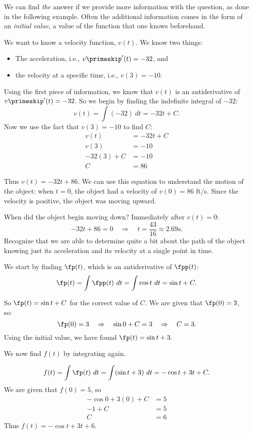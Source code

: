 We can find \textit{the} answer if we provide more information with the question, as done in the following example. Often the additional information comes in the form of an \textit{initial value}, a value of the function that one knows beforehand.

{We want to know a velocity function, $v(t)$. We know two things:
	\begin{itemize}
		\item		The acceleration, i.e., $v\primeskip'(t)= -32$, and
		\item		the velocity at a specific time, i.e., $v(3) = -10$.
	\end{itemize}
Using the first piece of information, we know that $v(t)$ is an antiderivative of $v\primeskip'(t)=-32$. So we begin by finding the indefinite integral of $-32$:
$$v(t)=\int (-32)\ dt = -32t+C.$$
Now we use the fact that $v(3)=-10$ to find $C$:
\begin{align*}
	v(t) &= -32t+C \\
	v(3) &= -10 \\
	-32(3)+C &= -10\\
	C &= 86
\end{align*}

Thus $v(t)= -32t+86$. We can use this equation to understand the motion of the object: when $t=0$, the object had a velocity of $v(0) = 86$ ft/s. Since the velocity is positive, the object was moving upward.

When did the object begin moving down? Immediately after $v(t) = 0$:
$$-32t+86 = 0 \quad \Rightarrow\quad  t = \frac{43}{16}  \approx 2.69\text{s}.$$
Recognize that we are able to determine quite a bit about the path of the object knowing just its acceleration and its velocity at a single point in time.}

{We start by finding $\fp(t)$, which is an antiderivative of $\fpp(t)$:
$$\fp(t)=\int \fpp(t)\ dt = \int \cos t\ dt = \sin t + C.$$

So $\fp(t) = \sin t+C$ for the correct value of $C$. We are given that $\fp(0) = 3$, so:
\[\fp(0) = 3 \quad \Rightarrow \quad \sin 0+C = 3 \quad \Rightarrow \quad C=3.\]
Using the initial value, we have found $\fp(t) = \sin t+ 3.$
		
We now find $f(t)$ by integrating again.

\[f(t)=\int \fp(t) \ dt = \int (\sin t+3)\ dt = -\cos t + 3t + C.\]
We are given that $f(0) = 5$, so
\begin{align*}
-\cos 0 + 3(0) + C &= 5 \\
-1 + C &= 5\\
C &= 6
\end{align*}
 Thus $f(t) = -\cos t + 3t + 6$.}

